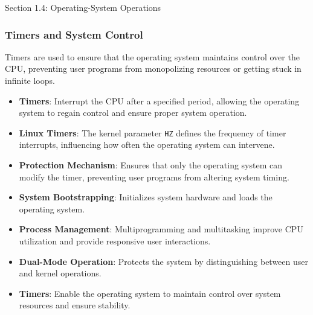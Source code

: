 \begin{notes}{Section 1.4: Operating-System Operations}
\begin{highlight}
    \end{highlight}
    
    \subsubsection*{Timers and System Control}
    
    Timers are used to ensure that the operating system maintains control over the CPU, preventing user programs from monopolizing resources or getting stuck in infinite loops.
    
    \begin{highlight}
    
    \begin{itemize}
        \item \textbf{Timers}: Interrupt the CPU after a specified period, allowing the operating system to regain control and ensure proper system operation.
        \item \textbf{Linux Timers}: The kernel parameter \texttt{HZ} defines the frequency of timer interrupts, influencing how often the operating system can intervene.
        \item \textbf{Protection Mechanism}: Ensures that only the operating system can modify the timer, preventing user programs from altering system timing.
    \end{itemize}
    
    \end{highlight}
    
    \begin{highlight}
    
    \begin{itemize}
        \item \textbf{System Bootstrapping}: Initializes system hardware and loads the operating system.
        \item \textbf{Process Management}: Multiprogramming and multitasking improve CPU utilization and provide responsive user interactions.
        \item \textbf{Dual-Mode Operation}: Protects the system by distinguishing between user and kernel operations.
        \item \textbf{Timers}: Enable the operating system to maintain control over system resources and ensure stability.
    \end{itemize}
    
    \end{highlight}
\end{notes}

